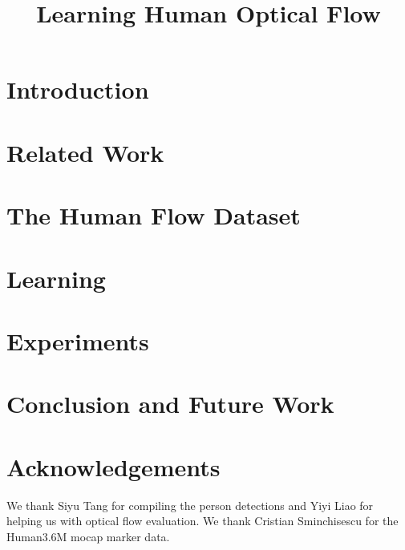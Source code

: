 \documentclass{bmvc2k}
\title{Learning Human Optical Flow}
\begin{document}
\maketitle

\begin{abstract}

\end{abstract}

\section{Introduction}


\section{Related Work}


\section{The Human Flow Dataset}


\section{Learning}


\section{Experiments}


\section{Conclusion and Future Work}


\section*{Acknowledgements}
We thank Siyu Tang for compiling the person detections and Yiyi Liao for helping us with
optical flow evaluation.  We thank Cristian Sminchisescu for the
Human3.6M mocap marker data.

\end{document}
